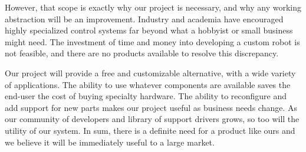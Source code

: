 \documentclass[10pt]{article}
\begin{document}
However, that scope is exactly why our project is necessary, and why any working abstraction will be an improvement.  Industry and academia have encouraged highly specialized control systems far beyond what a hobbyist or small business might need.  The investment of time and money into developing a custom robot is not feasible, and there are no products available to resolve this discrepancy.

Our project will provide a free and customizable alternative, with a wide variety of applications.  The ability to use whatever components are available saves the end-user the cost of buying specialty hardware.  The ability to reconfigure and add support for new parts makes our project useful as business needs change.  As our community of developers and library of support drivers grows, so too will the utility of our system.  In sum, there is a definite need for a product like ours and we believe it will be immediately useful to a large market. 
\end{document}
